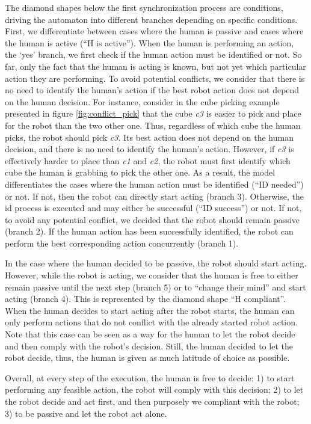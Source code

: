 The diamond shapes below the first synchronization process are conditions, driving the automaton into different branches depending on specific conditions. First, we differentiate between cases where the human is passive and cases where the human is active (``H is active''). 
When the human is performing an action, the `yes' branch, we first check if the human action must be identified or not. So far, only the fact that the human is acting is known, but not yet which particular action they are performing. 
To avoid potential conflicts, we consider that there is no need to identify the human's action if the best robot action does not depend on the human decision. For instance, consider in the cube picking example presented in figure \ref{fig:conflict_pick} that the cube \emph{c3} is easier to pick and place for the robot than the two other one. Thus, regardless of which cube the human picks, the robot should pick \emph{c3}. Its best action does not depend on the human decision, and there is no need to identify the human's action. However, if \emph{c3} is effectively harder to place than \emph{c1} and \emph{c2}, the robot must first identify which cube the human is grabbing to pick the other one. As a result, the model differentiates the cases where the human action must be identified (``ID needed'') or not. If not, then the robot can directly start acting (branch 3). Otherwise, the \acrfull{id} process is executed and may either be successful (``ID success'') or not. If not, to avoid any potential conflict, we decided that the robot should remain passive (branch 2). If the human action has been successfully identified, the robot can perform the best corresponding action concurrently (branch 1).

In the case where the human decided to be passive, the robot should start acting. 
However, while the robot is acting, we consider that the human is free to either remain passive until the next step (branch 5) or to ``change their mind'' and start acting (branch 4).
This is represented by the diamond shape ``H compliant''. When the human decides to start acting after the robot starts, the human can only perform actions that do not conflict with the already started robot action. Note that this case can be seen as a way for the human to let the robot decide and then comply with the robot's decision. Still, the human decided to let the robot decide, thus, the human is given as much latitude of choice as possible.

Overall, at every step of the execution, the human is free to decide: 1) to start performing any feasible action, the robot will comply with this decision; 2) to let the robot decide and act first, and then purposely we compliant with the robot; 3) to be passive and let the robot act alone.

